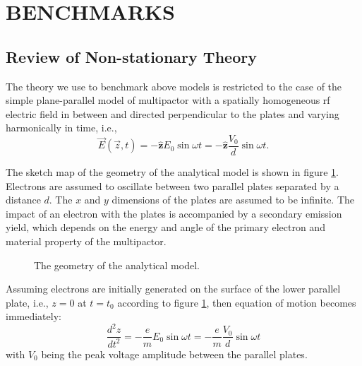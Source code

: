 \documentclass[aps,prstab,superscriptaddress,showpacs]{revtex4-1}
\begin{document}
\section{BENCHMARKS}
\subsection{Review of Non-stationary Theory}
The theory we use to benchmark above models is restricted to the case of the simple plane-parallel model of multipactor with a spatially homogeneous rf electric field in between and directed perpendicular to the plates and varying harmonically in time, i.e., 
\begin{equation}
\vec{E}(\vec{z},t) = -\mathbf{\hat{z}}E_0\sin \omega t=-\mathbf{\hat{z}}\frac{V_0}{d}\sin \omega t.
\end{equation} 

The sketch map of the geometry of the analytical model is shown in figure \ref{fig:sk}. Electrons are assumed to oscillate between two parallel plates separated by a distance $d$. The $x$ and $y$ dimensions of the plates are assumed to be infinite. The impact of an electron with the plates is accompanied by a secondary emission yield, which depends on the energy and angle of the primary electron and material property of the multipactor. 
 
\begin{figure}[H]
\begin{center}

\end{center}
\caption{The geometry of the analytical model.\label{fig:sk}}
\end{figure}
Assuming electrons are initially generated on the surface of the lower parallel plate, i.e., $z=0$ at $t=t_0$ according to figure \ref{fig:sk}, then equation of motion becomes immediately: 
\begin{equation}
\frac{d^2z}{dt^2} = -\frac{e}{m} E_0\sin\omega t= - \frac{e}{m}\frac{V_0}{d}\sin\omega t \label{scalar}
\end{equation}
with $V_0$ being  the peak voltage amplitude between the parallel plates.
\end{document}
